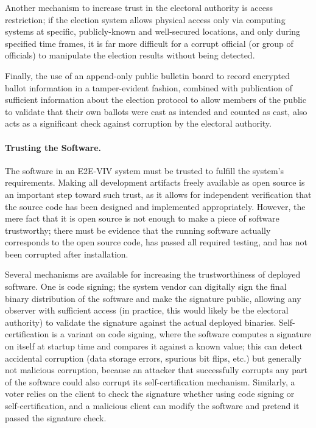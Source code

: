 Another mechanism to increase trust in the electoral authority is
access restriction; if the election system allows physical access only
via computing systems at specific, publicly-known and well-secured
locations, and only during specified time frames, it is far more
difficult for a corrupt official (or group of officials) to manipulate
the election results without being detected.

Finally, the use of an append-only public bulletin board to record
encrypted ballot information in a tamper-evident fashion, combined
with publication of sufficient information about the election protocol
to allow members of the public to validate that their own ballots were
cast as intended and counted as cast, also acts as a significant check
against corruption by the electoral authority.

\paragraph{Trusting the Software.} The software in an E2E-VIV system
must be trusted to fulfill the system's requirements. Making all
development artifacts freely available as open source is an important
step toward such trust, as it allows for independent verification that
the source code has been designed and implemented
appropriately. However, the mere fact that it is open source is not
enough to make a piece of software trustworthy; there must be evidence
that the running software actually corresponds to the open source
code, has passed all required testing, and has not been corrupted
after installation.

Several mechanisms are available for increasing the trustworthiness of
deployed software. One is code signing; the system vendor can
digitally sign the final binary distribution of the software and make
the signature public, allowing any observer with sufficient access (in
practice, this would likely be the electoral authority) to validate
the signature against the actual deployed binaries. Self-certification
is a variant on code signing, where the software computes a signature
on itself at startup time and compares it against a known value; this
can detect accidental corruption (data storage errors, spurious bit
flips, etc.) but generally not malicious corruption, because an
attacker that successfully corrupts any part of the software could
also corrupt its self-certification mechanism. Similarly, a voter
relies on the client to check the signature whether using code signing
or self-certification, and a malicious client can modify the software
and pretend it passed the signature check.

